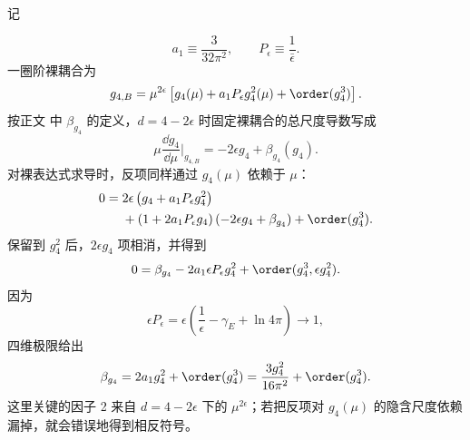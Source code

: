 \begin{derivation}
记

\begin{equation*}
 a_1\equiv\frac{3}{32\pi^2},
 \qquad
 P_\epsilon\equiv\frac1{\bar\epsilon}.
\end{equation*}
一圈阶裸耦合为
\begin{equation*}
 g_{4,B}
 =\mu^{2\epsilon}
 \left[g_4(\mu)+a_1P_\epsilon g_4^2(\mu)
 +\order(g_4^3)\right].
\end{equation*}
按正文 中 $\beta_{g_4}$ 的定义，$d=4-2\epsilon$ 时固定裸耦合的总尺度导数写成
\begin{equation*}
 \mu\frac{\dd g_4}{\dd\mu}\Big|_{g_{4,B}}
 =-2\epsilon g_4+\beta_{g_4}(g_4).
\end{equation*}
对裸表达式求导时，反项同样通过 \(g_4(\mu)\) 依赖于 \(\mu\)：
\begin{align*}
 0={}&2\epsilon
 \left(g_4+a_1P_\epsilon g_4^2\right)\\
 &+\left(1+2a_1P_\epsilon g_4\right)
 \left(-2\epsilon g_4+\beta_{g_4}\right)
 +\order(g_4^3).
\end{align*}
保留到 \(g_4^2\) 后，\(2\epsilon g_4\) 项相消，并得到
\begin{equation*}
 0=\beta_{g_4}
 -2a_1\epsilon P_\epsilon g_4^2
 +\order(g_4^3,\epsilon g_4^2).
\end{equation*}
因为
\begin{equation*}
 \epsilon P_\epsilon
 =\epsilon\left(\frac1\epsilon-\gamma_E+\ln4\pi\right)
 \longrightarrow1,
\end{equation*}
四维极限给出
\begin{equation*}
 \beta_{g_4}=2a_1g_4^2+
\order(g_4^3)
 =\frac{3g_4^2}{16\pi^2}+
\order(g_4^3).
\end{equation*}
这里关键的因子 2 来自 \(d=4-2\epsilon\) 下的 \(\mu^{2\epsilon}\)；若把反项对 \(g_4(\mu)\) 的隐含尺度依赖漏掉，就会错误地得到相反符号。
\end{derivation}

